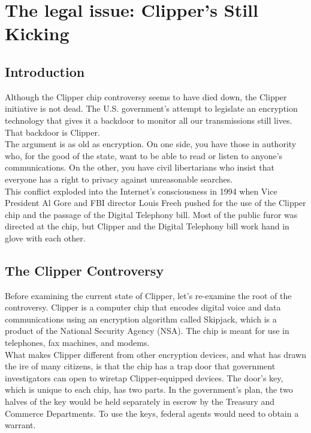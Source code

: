 \chapter{The legal issue: Clipper's Still Kicking}

\section{Introduction}
Although the Clipper chip controversy seems to have died down, the
Clipper initiative is not dead. The U.S. government's attempt to
legislate an encryption technology that gives it a backdoor to monitor
all our transmissions still lives. That backdoor is Clipper.\\

The argument is as old as encryption. On one side, you have those in
authority who, for the good of the state, want to be able to read or
listen to anyone's communications. On the other, you have civil
libertarians who insist that everyone has a right to privacy against
unreasonable searches.\\

This conflict exploded into the Internet's consciousness in 1994 when
Vice President Al Gore and FBI director Louis Freeh pushed for the use
of the Clipper chip and the passage of the Digital Telephony bill. Most
of the public furor was directed at the chip, but Clipper and the
Digital Telephony bill work hand in glove with each other.

\section{The Clipper Controversy}
Before examining the current state of Clipper, let's re-examine the
root of the controversy. Clipper is a computer chip that encodes
digital voice and data communications using an encryption algorithm
called Skipjack, which is a product of the National Security Agency
(NSA). The chip is meant for use in telephones, fax machines, and
modems.\\

What makes Clipper different from other encryption devices, and what
has drawn the ire of many citizens, is that the chip has a trap door
that government investigators can open to wiretap Clipper-equipped
devices. The door's key, which is unique to each chip, has two parts.
In the government's plan, the two halves of the key would be held
separately in escrow by the Treasury and Commerce Departments. To use
the keys, federal agents would need to obtain a warrant.\\

